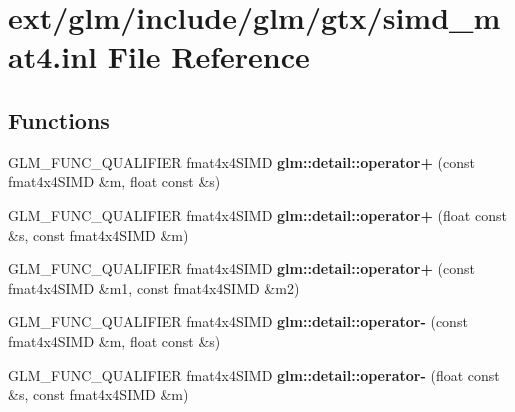 \hypertarget{simd__mat4_8inl}{\section{ext/glm/include/glm/gtx/simd\-\_\-mat4.inl File Reference}
\label{simd__mat4_8inl}
}
\subsection*{Functions}
\begin{DoxyCompactItemize}
\item 
\hypertarget{namespaceglm_1_1detail_a629935a47dc01b2cd4aa5598f364e359}{G\-L\-M\-\_\-\-F\-U\-N\-C\-\_\-\-Q\-U\-A\-L\-I\-F\-I\-E\-R fmat4x4\-S\-I\-M\-D {\bfseries glm\-::detail\-::operator+} (const fmat4x4\-S\-I\-M\-D \&m, float const \&s)}\label{namespaceglm_1_1detail_a629935a47dc01b2cd4aa5598f364e359}

\item 
\hypertarget{namespaceglm_1_1detail_a4b632f8b13f05642eea7d551815f0923}{G\-L\-M\-\_\-\-F\-U\-N\-C\-\_\-\-Q\-U\-A\-L\-I\-F\-I\-E\-R fmat4x4\-S\-I\-M\-D {\bfseries glm\-::detail\-::operator+} (float const \&s, const fmat4x4\-S\-I\-M\-D \&m)}\label{namespaceglm_1_1detail_a4b632f8b13f05642eea7d551815f0923}

\item 
\hypertarget{namespaceglm_1_1detail_a9f20d29252cc62031ba3b05aff1d2fe8}{G\-L\-M\-\_\-\-F\-U\-N\-C\-\_\-\-Q\-U\-A\-L\-I\-F\-I\-E\-R fmat4x4\-S\-I\-M\-D {\bfseries glm\-::detail\-::operator+} (const fmat4x4\-S\-I\-M\-D \&m1, const fmat4x4\-S\-I\-M\-D \&m2)}\label{namespaceglm_1_1detail_a9f20d29252cc62031ba3b05aff1d2fe8}

\item 
\hypertarget{namespaceglm_1_1detail_aab9939909f4d23c042e7d438dda5caca}{G\-L\-M\-\_\-\-F\-U\-N\-C\-\_\-\-Q\-U\-A\-L\-I\-F\-I\-E\-R fmat4x4\-S\-I\-M\-D {\bfseries glm\-::detail\-::operator-\/} (const fmat4x4\-S\-I\-M\-D \&m, float const \&s)}\label{namespaceglm_1_1detail_aab9939909f4d23c042e7d438dda5caca}

\item 
\hypertarget{namespaceglm_1_1detail_a470e32d5d0337f7714ecb8c8c9ad368d}{G\-L\-M\-\_\-\-F\-U\-N\-C\-\_\-\-Q\-U\-A\-L\-I\-F\-I\-E\-R fmat4x4\-S\-I\-M\-D {\bfseries glm\-::detail\-::operator-\/} (float const \&s, const fmat4x4\-S\-I\-M\-D \&m)}\label{namespaceglm_1_1detail_a470e32d5d0337f7714ecb8c8c9ad368d}


\end{DoxyCompactItemize}
